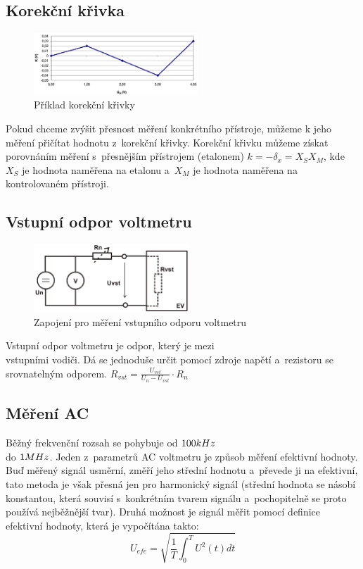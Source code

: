 \documentclass{article}
\begin{document}
\newpage
\subsection*{Korekční křivka}
\begin{figure}
    \includegraphics[width=0.55\textwidth]{obrazky/korekcni_krivka.png}
    \caption{\label{korek_krivka}Příklad korekční křivky}
\end{figure}
Pokud chceme zvýšit přesnost měření konkrétního přístroje, můžeme k jeho měření přičítat hodnotu z~korekční křivky.
Korekční křivku můžeme získat porovnáním měření s~přesnějším přístrojem (etalonem) \(k = -\delta_x = X_S X_M\), kde \(X_S\) je hodnota naměřena na etalonu a~\(X_M\) je hodnota naměřena na kontrolovaném přístroji.

\subsection*{Vstupní odpor voltmetru}
\begin{figure}
    \vspace{-10mm}
    \includegraphics[width=0.52\textwidth]{obrazky/vstup_odpor.png}
    \caption{\label{vstupni_odpor}Zapojení pro měření vstupního odporu voltmetru}
\end{figure}
Vstupní odpor voltmetru je odpor, který je mezi \\vstupními vodiči.
Dá se jednoduše určit pomocí zdroje napětí a~rezistoru se srovnatelným odporem.
\(R_{vst}=\frac{U_{vst}}{U_{n}-U_{vst}}\cdot R_n\)

\subsection*{Měření AC}
Běžný frekvenční rozsah se pohybuje od \(100\-kHz\) \\do \(1\-MHz\).
Jeden z~parametrů AC voltmetru je způsob měření efektivní hodnoty.
Buď měřený signál usměrní, změří jeho střední hodnotu a~převede ji na efektivní, tato metoda je však přesná jen pro harmonický signál (střední hodnota se násobí konstantou, která souvisí s~konkrétním tvarem signálu a~pochopitelně se proto používá nejběžnější tvar).
Druhá možnost je signál měřit pomocí definice efektivní hodnoty, která je vypočítána takto:
\begin{equation}
    U_{efe} = \sqrt{\frac{1}{T}\int_{0}^{T}U^2(t)dt}
    \label{proud_kolektoru}
\end{equation}
\end{document}
